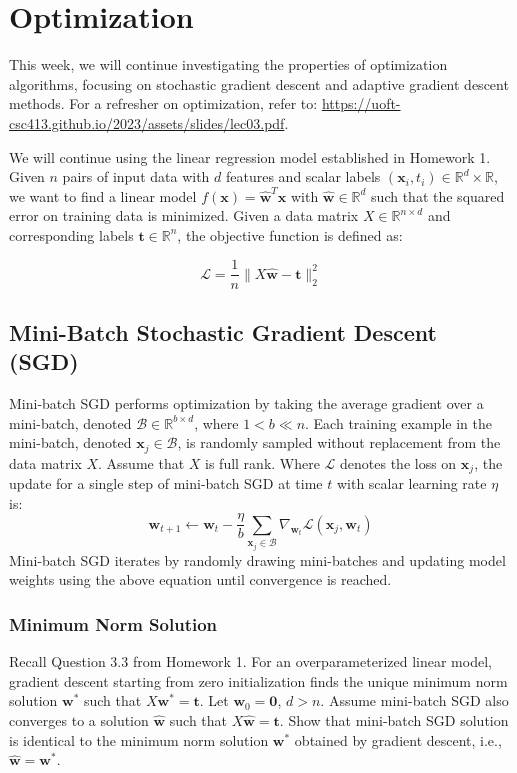 \section{Optimization} \label{sec:opt}
This week, we will continue investigating the properties of optimization algorithms, focusing on stochastic gradient descent and adaptive gradient descent methods. For a refresher on optimization, refer to: \url{https://uoft-csc413.github.io/2023/assets/slides/lec03.pdf}.
\vspace{0.5em}

We will continue using the linear regression model established in Homework 1. Given $n$ pairs of input data with $d$ features and scalar labels $(\mathbf{x}_i, t_i) \in \mathbb{R}^d \times \mathbb{R}$, we want to find a linear model $f(\mathbf{x}) = \hat{\mathbf{w}}^T \mathbf{x}$ with $\hat{\mathbf{w}} \in \mathbb{R}^d$ such that the squared error on training data is minimized. Given a data matrix $X \in \mathbb{R}^{n\times d}$ and corresponding labels $\mathbf{t} \in \mathbb{R}^n$, the objective function is defined as:

\begin{equation}
    \mathcal{L} = \frac{1}{n} \|X \hat{\mathbf{w}} - \mathbf{t} \|^2_2
\end{equation}

\subsection{Mini-Batch Stochastic Gradient Descent (SGD)}
Mini-batch SGD performs optimization by taking the average gradient over a mini-batch, denoted $\mathcal{B} \in \mathbb{R}^{b\times d}$, where $1 < b \ll n$. Each training example in the mini-batch, denoted $\mathbf{x}_j \in \mathcal{B}$, is randomly sampled without replacement from the data matrix $X$. Assume that $X$ is full rank. Where $\mathcal{L}$ denotes the loss on $\mathbf{x}_j$, the update for a single step of mini-batch SGD at time $t$ with scalar learning rate $\eta$ is:
\begin{equation}
    \mathbf{w}_{t+1} \leftarrow \mathbf{w}_t -  \frac{\eta}{b} \sum_{\mathbf{x}_j \in \mathcal{B}} \nabla_{\mathbf{w}_t} \mathcal{L}(\mathbf{x}_j, \mathbf{w}_t)
\end{equation}
Mini-batch SGD iterates by randomly drawing mini-batches and updating model weights using the above equation until convergence is reached.

\subsubsection{Minimum Norm Solution \color{blue}{[2pt]} \LII} \label{sec:SGD}
Recall Question 3.3 from Homework 1. For an overparameterized linear model, gradient descent starting from zero initialization finds the unique minimum norm solution $\mathbf{w}^*$ such that $X\mathbf{w}^* = \mathbf{t}$. Let $\mathbf{w}_0 = \mathbf{0}$, $d>n$. Assume mini-batch SGD also converges to a solution $\hat{\mathbf{w}}$ such that $X \hat{\mathbf{w}} = \mathbf{t}$. Show that mini-batch SGD solution is identical to the minimum norm solution $\mathbf{w}^*$ obtained by gradient descent, i.e., $\mathbf{\hat{w}} = \mathbf{w}^*$.

